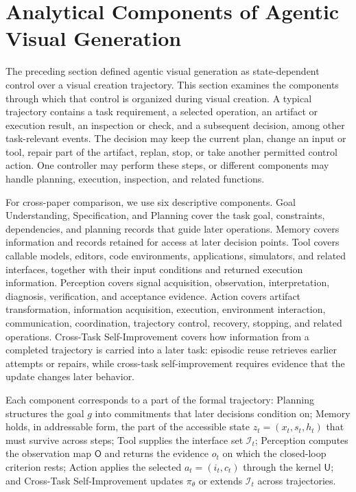 \section{Analytical Components of Agentic Visual Generation}
\label{sec:components}

The preceding section defined agentic visual generation as state-dependent control over a visual creation trajectory. This section examines the components through which that control is organized during visual creation. A typical trajectory contains a task requirement, a selected operation, an artifact or execution result, an inspection or check, and a subsequent decision, among other task-relevant events. The decision may keep the current plan, change an input or tool, repair part of the artifact, replan, stop, or take another permitted control action. One controller may perform these steps, or different components may handle planning, execution, inspection, and related functions.

For cross-paper comparison, we use six descriptive components. Goal Understanding, Specification, and Planning cover the task goal, constraints, dependencies, and planning records that guide later operations. Memory covers information and records retained for access at later decision points. Tool covers callable models, editors, code environments, applications, simulators, and related interfaces, together with their input conditions and returned execution information. Perception covers signal acquisition, observation, interpretation, diagnosis, verification, and acceptance evidence. Action covers artifact transformation, information acquisition, execution, environment interaction, communication, coordination, trajectory control, recovery, stopping, and related operations. Cross-Task Self-Improvement covers how information from a completed trajectory is carried into a later task: episodic reuse retrieves earlier attempts or repairs, while cross-task self-improvement requires evidence that the update changes later behavior. 

Each component corresponds to a part of the formal trajectory: Planning structures the goal $g$ into commitments that later decisions condition on; Memory holds, in addressable form, the part of the accessible state $z_t=(x_t,s_t,h_t)$ that must survive across steps; Tool supplies the interface set $\mathcal{I}_t$; Perception computes the observation map $\mathsf{O}$ and returns the evidence $o_t$ on which the closed-loop criterion rests; Action applies the selected $a_t=(i_t,c_t)$ through the kernel $\mathsf{U}$; and Cross-Task Self-Improvement updates $\pi_\theta$ or extends $\mathcal{I}_t$ across trajectories.

